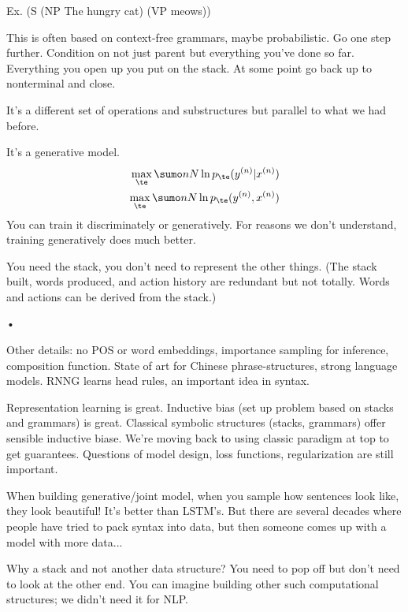 \begin{enumerate}
Ex. (S (NP The hungry cat) (VP meows))

This is often based on context-free grammars, maybe probabilistic. Go one step further. Condition on not just parent but everything you've done so far. Everything you open up you put on the stack. At some point go back up to nonterminal and close.

It's a different set of operations and substructures but parallel to what we had before. 

It's a generative model. 
\begin{align}
\max_\te \sumo nN \ln p_\te(y^{(n)}|x^{(n)})\\
\max_\te \sumo nN \ln p_\te(y^{(n)},x^{(n)})
\end{align}
You can train it discriminately or generatively. For reasons we don't understand, training generatively does much better. 

You need the stack, you don't need to represent the other things. (The stack built, words produced, and action history are  redundant but not totally. Words and actions can be derived from the stack.)
\end{enumerate}•

Other details: no POS or word embeddings, importance sampling for inference, composition function. State of art for Chinese phrase-structures, strong language models. RNNG learns head rules, an important idea in syntax.

Representation learning is great. Inductive bias (set up problem based on stacks and grammars) is great. Classical symbolic structures (stacks, grammars) offer sensible inductive biase. We're moving back to using classic paradigm at top to get guarantees. Questions of model design, loss functions, regularization are still important.


When building generative/joint model, when you sample how sentences look like, they look beautiful! 
It's better than LSTM's. But there are several decades where people have tried to pack syntax into data, but then someone comes up with a model with more data...

Why a stack and not another data structure? You need to pop off but don't need to look at the other end. You can imagine building other such computational structures; we didn't need it for NLP.


